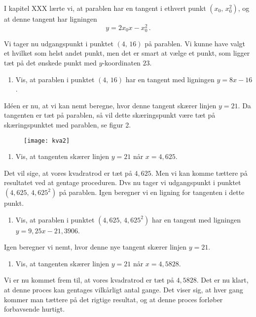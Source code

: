 \documentclass[12pt,oneside,a4paper]{article}
\theoremstyle{plain}
\begin{document}
I kapitel XXX lærte vi, at parablen har en tangent i ethvert punkt $(x_0,\,
x_0^2)$, og at denne tangent har ligningen
\[
    y=2x_0x - x_0^2 \,.
\]

Vi tager nu udgangspunkt i punktet $(4,\,16)$ på parablen. Vi kunne have valgt
et hvilket som helst andet punkt, men det er smart at vælge et punkt, som
ligger tæt på det ønskede punkt med $y$-koordinaten $23$.

\begin{enumerate}[label=(\alph*)]
    \item Vis, at parablen i punktet $(4,\,16)$ har en tangent med ligningen
        $y=8x-16$.
\end{enumerate}

Idéen er nu, at vi kan nemt beregne, hvor denne tangent skærer linjen $y=21$. 
Da tangenten er tæt på parablen, så vil dette skæringspunkt være tæt på 
skæringspunktet med parablen, se figur 2.

\begin{figure}[ht]
    \centering
    \texttt{[image: kva2]}
    \caption{}
    \label{fig2}
\end{figure}

\begin{enumerate}[label=(\alph*), resume]
    \item Vis, at tangenten skærer linjen $y=21$ når $x=4,625$.
\end{enumerate}

Det vil sige, at vores kvadratrod er tæt på $4,625$. Men vi kan
komme tættere på resultatet ved at gentage proceduren. Dvs nu tager vi
udgangspunkt i punktet $(4,625,\,4,625^2)$ på parablen. Igen beregner vi en ligning for tangenten i dette punkt.

\begin{enumerate}[label=(\alph*), resume]
    \item Vis, at parablen i punktet $(4,625,\,4,625^2)$ har en tangent med
        ligningen $y=9,25x-21,3906$.
\end{enumerate}
Igen beregner vi nemt, hvor denne nye tangent skærer linjen $y=21$.

\begin{enumerate}[label=(\alph*), resume]
    \item Vis, at tangenten skærer linjen $y=21$ når $x=4,5828$.
\end{enumerate}

Vi er nu kommet frem til, at vores kvadratrod er tæt på $4,5828$.
Det er nu klart, at denne proces kan gentages vilkårligt antal gange.
Det viser sig, at hver gang kommer man tættere på det rigtige resultat, og
at denne proces forløber forbavsende hurtigt.
\end{document}
